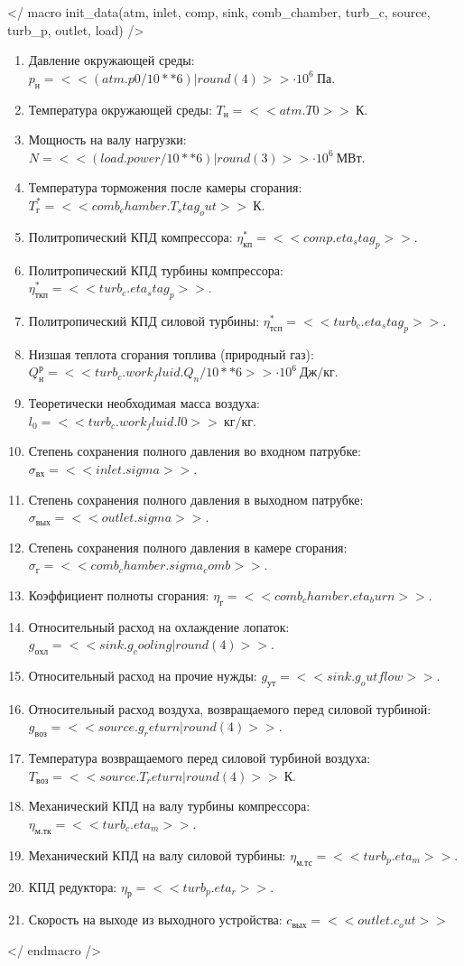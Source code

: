 ﻿\usepackage{amsmath}

</ macro init_data(atm, inlet, comp, sink, comb_chamber, turb_c, source, turb_p, outlet, load)  />
\begin{enumerate}

	\item Давление окружающей среды: $p_{н} = << (atm.p0 / 10**6)|round(4) >> \cdot 10^6\ Па$.
	\item Температура окружающей среды: $T_{н} = << atm.T0 >>\ К$.
	\item Мощность на валу нагрузки: $ N = << (load.power/ 10**6) | round(3) >> \cdot 10^6\ МВт $.
	\item Температура торможения после камеры сгорания: $T_г^* = << comb_chamber.T_stag_out >>\ К$.
	\item Политропический КПД компрессора: $\eta^*_{к п} = << comp.eta_stag_p >> $.
	\item Политропический КПД турбины компрессора: $\eta^*_{ткп} = << turb_c.eta_stag_p >>$.
	\item Политропический КПД силовой турбины: $\eta^*_{тсп} = << turb_c.eta_stag_p >>$.
	\item Низшая теплота сгорания топлива (природный газ): $Q^р_н = << turb_c.work_fluid.Q_n / 10**6>> \cdot 10^6\ Дж/кг$.
	\item Теоретически необходимая масса воздуха: $l_0 = << turb_c.work_fluid.l0 >>\ кг/кг$.

	\item Степень сохранения полного давления во входном патрубке: $\sigma_{вх} = << inlet.sigma >>$.
	\item Степень сохранения полного давления в выходном патрубке: $\sigma_{вых} = << outlet.sigma >>$.
	\item Степень сохранения полного давления в камере сгорания: $\sigma_г = << comb_chamber.sigma_comb >>$.
	\item Коэффициент полноты сгорания: $\eta_г = << comb_chamber.eta_burn >> $.
	\item Относительный расход на охлаждение лопаток: $g_{охл} = << sink.g_cooling | round(4) >>$.
	\item Относительный расход на прочие нужды: $g_{ут} = << sink.g_outflow >>$.
	\item Относительный расход воздуха, возвращаемого перед силовой турбиной: $g_{воз} = << source.g_return |round(4) >>$.
	\item Температура возвращаемого перед силовой турбиной воздуха: $T_{воз} = << source.T_return | round(4) >>\ К$.
	\item Механический КПД на валу турбины компрессора: $\eta_{м.тк} = << turb_c.eta_m >>$.
	\item Механический КПД на валу силовой турбины: $\eta_{м.тс} = << turb_p.eta_m >>$.
	\item КПД редуктора: $ \eta_р = << turb_p.eta_r >>$.
	\item Скорость на выходе из выходного устройства: $ c_{вых} = << outlet.c_out >> $

\end{enumerate}
</ endmacro />

